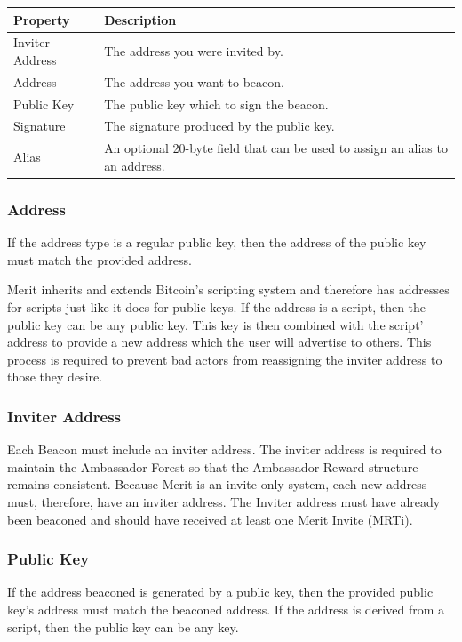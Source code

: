 \documentclass{article}
\begin{document}
\begin{center}
    \begin{tabular}{l|p{9cm}}
        Property & Description \\ \hline
        Inviter Address & The address you were invited by. \\
        Address & The address you want to beacon. \\
        Public Key & The public key which to sign the beacon. \\
        Signature & The signature produced by the public key. \\
        Alias & An optional 20-byte field that can be used to assign an alias to an address.\\
    \end{tabular}
\end{center}

\subsubsection{Address}
If the address type is a regular public key, then the address of the public 
key must match the provided address.

Merit inherits and extends Bitcoin's scripting system and therefore has addresses
for scripts just like it does for public keys. If the address is a script, then
the public key can be any public key.  This key is then combined with the script' address to 
provide a new address which the user will advertise to others. This process is
required to prevent bad actors from reassigning the \gls{inviter address} to those
they desire.

\subsubsection{Inviter Address}

Each Beacon must include an inviter address. The inviter address is required to maintain the
Ambassador Forest so that the Ambassador Reward structure remains consistent.
Because Merit is an invite-only system, each new address must, therefore, have an
inviter address. The Inviter address must have already been beaconed and should have received at least 
one Merit Invite (MRTi).

\subsubsection{Public Key}

If the address beaconed is generated by a public key, then the provided public key's
address must match the beaconed address. If the address is derived from a script,
then the public key can be any key.
\end{document}
